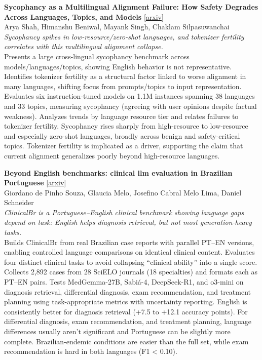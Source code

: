 \documentclass[12pt,letterpaper]{article}
\begin{document}
\medskip

{\small\textbf{Sycophancy as a Multilingual Alignment Failure: How Safety Degrades Across Languages, Topics, and Models}} {\scriptsize[\href{https://arxiv.org/abs/2606.08451}{arxiv}]}\\
{\scriptsize Arya Shah, Himanshu Beniwal, Mayank Singh, Chaklam Silpasuwanchai}\\

{\small\textit{Sycophancy spikes in low-resource/zero-shot languages, and tokenizer fertility correlates with this multilingual alignment collapse.}}\\[1pt]
{\footnotesize Presents a large cross-lingual sycophancy benchmark across models/languages/topics, showing English behavior is not representative. Identifies tokenizer fertility as a structural factor linked to worse alignment in many languages, shifting focus from prompts/topics to input representation. Evaluates six instruction-tuned models on 1.1M instances spanning 38 languages and 33 topics, measuring sycophancy (agreeing with user opinions despite factual weakness). Analyzes trends by language resource tier and relates failures to tokenizer fertility. Sycophancy rises sharply from high-resource to low-resource and especially zero-shot languages, broadly across benign and safety-critical topics. Tokenizer fertility is implicated as a driver, supporting the claim that current alignment generalizes poorly beyond high-resource languages.}

\medskip

{\small\textbf{Beyond English benchmarks: clinical llm evaluation in Brazilian Portuguese}} {\scriptsize[\href{https://arxiv.org/abs/2606.07853}{arxiv}]}\\
{\scriptsize Giordano de Pinho Souza, Glaucia Melo, Josefino Cabral Melo Lima, Daniel Schneider}\\

{\small\textit{ClinicalBr is a Portuguese--English clinical benchmark showing language gaps depend on task: English helps diagnosis retrieval, but not most generation-heavy tasks.}}\\[1pt]
{\footnotesize Builds ClinicalBr from real Brazilian case reports with parallel PT--EN versions, enabling controlled language comparisons on identical clinical content. Evaluates four distinct clinical tasks to avoid collapsing ``clinical ability'' into a single score. Collects 2,892 cases from 28 SciELO journals (18 specialties) and formats each as PT--EN pairs. Tests MedGemma-27B, Sabiá-4, DeepSeek-R1, and o3-mini on diagnosis retrieval, differential diagnosis, exam recommendation, and treatment planning using task-appropriate metrics with uncertainty reporting. English is consistently better for diagnosis retrieval (+7.5 to +12.1 accuracy points). For differential diagnosis, exam recommendation, and treatment planning, language differences usually aren't significant and Portuguese can be slightly more complete. Brazilian-endemic conditions are easier than the full set, while exam recommendation is hard in both languages (F1 < 0.10).}
\end{document}
